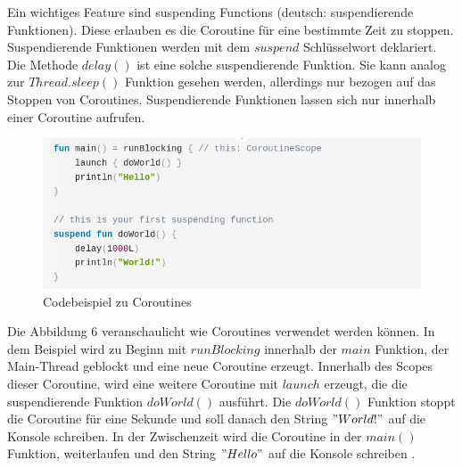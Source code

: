 \documentclass{article}
\begin{document}
Ein wichtiges Feature sind suspending Functions (deutsch: suspendierende Funktionen). Diese erlauben es die Coroutine für eine bestimmte Zeit zu stoppen. Suspendierende Funktionen werden mit dem $suspend$ Schlüsselwort deklariert. Die Methode $delay()$ ist eine solche suspendierende Funktion. Sie kann analog zur $Thread.sleep()$ Funktion gesehen werden, allerdings nur bezogen auf das Stoppen von Coroutines. Suspendierende Funktionen lassen sich nur innerhalb einer Coroutine aufrufen. \cite{KotlinLangDocCoroutines}

\begin{figure}[!htb]
    \centering
    \includegraphics[width=0.9\columnwidth]{img/Coroutine.png}
    \caption{Codebeispiel zu Coroutines\footnotemark}
\end{figure}

Die Abbildung 6 veranschaulicht wie Coroutines verwendet werden können. In dem Beispiel wird zu Beginn mit $runBlocking$ innerhalb der $main$ Funktion, der Main-Thread geblockt und eine neue Coroutine erzeugt. Innerhalb des Scopes dieser Coroutine, wird eine weitere Coroutine mit $launch$ erzeugt, die die suspendierende Funktion $doWorld()$ ausführt. Die $doWorld()$ Funktion stoppt die Coroutine für eine Sekunde und soll danach den String $"World!"$ auf die Konsole schreiben. In der Zwischenzeit wird die Coroutine in der $main()$ Funktion, weiterlaufen und den String $"Hello"$ auf die Konsole schreiben \cite{KotlinLangDocCoroutines}.
\end{document}
